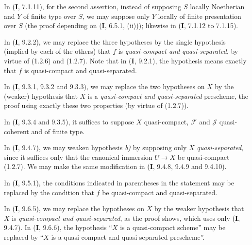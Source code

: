 \begin{env}[1.7.3]
\label{IV.1.7.3}
In (\textbf{I}, 7.1.11), for the second assertion, instead of supposing $S$
locally Noetherian and $Y$ of finite type over $S$, we may suppose only
$Y$ locally of finite presentation over $S$ (the proof depending on
(\textbf{I}, 6.5.1, (ii))); likewise in (\textbf{I}, 7.1.12 to 7.1.15).
\end{env}

\begin{env}[1.7.4]\label{IV.1.7.4}
In (\textbf{I}, 9.2.2), we may replace the three hypotheses by the single hypothesis
(implied by each of the others) that $f$ is \emph{quasi-compact and
quasi-separated}, by virtue of (1.2.6) and (1.2.7). Note that in
(\textbf{I}, 9.2.1), the hypothesis means exactly that $f$ is quasi-compact and
quasi-separated.
\end{env}

\begin{env}[1.7.5]
\label{IV.1.7.5}
In (\textbf{I}, 9.3.1, 9.3.2 and 9.3.3), we may replace the two hypotheses on $X$
by the (weaker) hypothesis that $X$ is a \emph{quasi-compact and
quasi-separated} prescheme, the proof using exactly these two properties (by
virtue of (1.2.7)).
\end{env}

\begin{env}[1.7.6]
\label{IV.1.7.6}
In (\textbf{I}, 9.3.4 and 9.3.5), it suffices to suppose $X$ quasi-compact,
$\mathcal F$ and $\mathcal J$ quasi-coherent and of finite type.
\end{env}

\begin{env}[1.7.7]
\label{IV.1.7.7}
In (\textbf{I}, 9.4.7), we may weaken hypothesis \emph{b)} by supposing only $X$
\emph{quasi-separated}, since it suffices only that the canonical immersion
$U\to X$ be quasi-compact (1.2.7). We may make the same modification in
(\textbf{I}, 9.4.8, 9.4.9 and 9.4.10).
\end{env}

\begin{env}[1.7.8]
\label{IV.1.7.8}
In (\textbf{I}, 9.5.1), the conditions indicated in parentheses in the statement
may be replaced by the condition that $f$ be quasi-compact and
quasi-separated.
\end{env}

\begin{env}[1.7.9]
\label{IV.1.7.9}
In (\textbf{I}, 9.6.5), we may replace the hypotheses on $X$ by the weaker
hypothesis that $X$ is \emph{quasi-compact and quasi-separated}, as the
proof shows,
which uses only (\textbf{I}, 9.4.7). In (\textbf{I}, 9.6.6), the hypothesis ``$X$ is a
quasi-compact scheme'' may be replaced by ``$X$ is a quasi-compact and
quasi-separated prescheme''.
\end{env}

